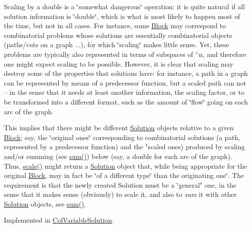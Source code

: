 Scaling by a double is a \char`\"{}somewhat dangerous\char`\"{} operation\+: it is quite natural if all solution information is \char`\"{}double\char`\"{}, which is what is most likely to happen most of the time, but not in all cases. For instance, some \mbox{\hyperlink{class_s_m_spp__di__unipi__it_1_1_block}{Block}} may correspond to combinatorial problems whose solutions are essentially combinatorial objects (paths/cuts on a graph ...), for which \char`\"{}scaling\char`\"{} makes little sense. Yet, these problems are typically also represented in terms of subspaces of $^\wedge$n, and therefore one might expect scaling to be possible. However, it is clear that scaling may destroy some of the properties that solutions have\+: for instance, a path in a graph can be represented by means of a predecessor function, but a scaled path can not -- in the sense that it needs at least another information, the scaling factor, or to be transformed into a different format, such as the amount of \char`\"{}flow\char`\"{} going on each arc of the graph.

This implies that there might be different \mbox{\hyperlink{class_s_m_spp__di__unipi__it_1_1_solution}{Solution}} objects relative to a given \mbox{\hyperlink{class_s_m_spp__di__unipi__it_1_1_block}{Block}}; say, the \char`\"{}original ones\char`\"{} corresponding to combinatorial solutions (a path, represented by a predecessor function) and the "scaled ones) produced by scaling and/or summing (see \mbox{\hyperlink{class_s_m_spp__di__unipi__it_1_1_solution_adc2450947fd142657637bf79d91505a9}{sum()}}) below (say, a double for each arc of the graph). Thus, \mbox{\hyperlink{class_s_m_spp__di__unipi__it_1_1_solution_abf1a2d1763f128a72b2677d4b9ff4d3b}{scale()}} might return a \mbox{\hyperlink{class_s_m_spp__di__unipi__it_1_1_solution}{Solution}} object that, while being appropriate for the original \mbox{\hyperlink{class_s_m_spp__di__unipi__it_1_1_block}{Block}}, may in fact be \char`\"{}of
a different type\char`\"{} than the originating one\char`\"{}. The requirement is that the
newly created Solution must be a \char`\"{}general" one, in the sense that it makes sense (obviously) to scale it, and also to {\itshape sum} it with other \mbox{\hyperlink{class_s_m_spp__di__unipi__it_1_1_solution}{Solution}} objects, see \mbox{\hyperlink{class_s_m_spp__di__unipi__it_1_1_solution_adc2450947fd142657637bf79d91505a9}{sum()}}. 

Implemented in \mbox{\hyperlink{class_s_m_spp__di__unipi__it_1_1_col_variable_solution_ae540e7cdfd7d10111ae795606dfa58e2}{Col\+Variable\+Solution}}.

